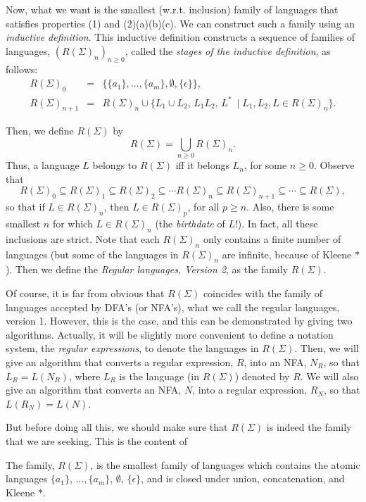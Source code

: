 \medskip
Now, what we want is the smallest (w.r.t. inclusion)
family of languages
that satisfies properties (1) and (2)(a)(b)(c).
We can  construct such a family using an 
{\it inductive definition\/}. This inductive definition
constructs a sequence of families of languages,
$(R(\Sigma)_n)_{n \geq 0}$, called the
{\it stages of the inductive definition\/}, as follows:
\begin{eqnarray*}
R(\Sigma)_0 &= & \{\{a_1\}, \ldots, \{a_m\}, \emptyset, \{\epsilon\}\},\\
R(\Sigma)_{n+1} &= & R(\Sigma)_{n}\cup \{L_1\cup L_2,\, L_1L_2,\, L^*\ \mid 
 L_1, L_2, L \in  R(\Sigma)_{n}\}.
\end{eqnarray*}

Then, we define $R(\Sigma)$ by
\[
R(\Sigma) = \bigcup_{n\geq 0} R(\Sigma)_{n}.
\]
Thus, a language $L$ belongs to $R(\Sigma)$ iff
it belongs $L_n$, for some $n\geq 0$.
Observe that
\[
R(\Sigma)_0 \subseteq R(\Sigma)_1 \subseteq  R(\Sigma)_2 \subseteq 
\cdots  R(\Sigma)_n \subseteq R(\Sigma)_{n+1} \subseteq \cdots
\subseteq R(\Sigma),
\]
so that if $L\in R(\Sigma)_n$, then  $L\in R(\Sigma)_p$, 
for all $p \geq n$. Also, there is some smallest
$n$ for which $L\in R(\Sigma)_n$ (the {\it birthdate\/} of $L$!).
In fact, all these inclusions are strict.
Note that each $R(\Sigma)_n$ only contains a finite
number of languages (but some of the languages in $R(\Sigma)_n$
are infinite, because of Kleene $*$).
%
Then we define the {\it Regular languages, Version 2\/}, as
the family $R(\Sigma)$. 

\medskip
Of course, it is far from obvious that $R(\Sigma)$ coincides
with the family of languages accepted by DFA's (or NFA's),
what we call the regular languages, version 1.
However, this is the case, and this can be demonstrated by giving
two algorithms. Actually, it will be slightly more convenient
to define a notation system, the {\it regular expressions\/},
to denote the languages in $R(\Sigma)$.  Then,
we will give an algorithm that converts a regular expression,
$R$, into an NFA, $N_R$, so that $L_R = L(N_R)$, where
$L_R$ is the language (in $R(\Sigma)$) denoted by $R$.
We will also give an algorithm that converts an NFA, $N$, into
a regular expression, $R_N$, so that $L(R_N) = L(N)$.

\medskip
But before doing all this, we should make sure that
$R(\Sigma)$ is indeed the family that
we are seeking. This is the content of


\begin{lemma}
\label{clolem1}
The family, $R(\Sigma)$, is the smallest family
of languages which contains the atomic languages
$\{a_1\}$, $\ldots, \{a_m\}$, $\emptyset$, $\{\epsilon\}$, 
and is closed under union, concatenation, and Kleene $*$.
\end{lemma}


